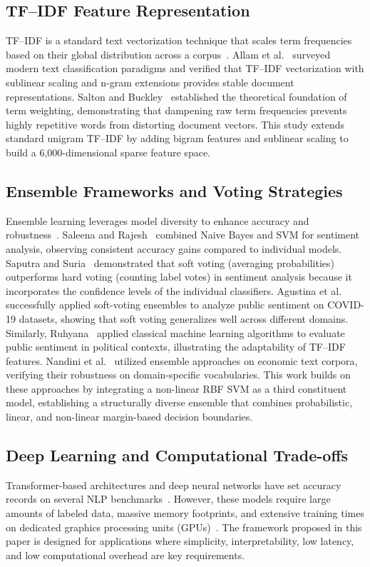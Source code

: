 \documentclass[conference]{IEEEtran}
\begin{document}
\subsection{TF--IDF Feature Representation}
TF--IDF is a standard text vectorization technique that scales term frequencies based on their global distribution across a corpus~\cite{ref7,ref8}. Allam et al.~\cite{ref7} surveyed modern text classification paradigms and verified that TF--IDF vectorization with sublinear scaling and n-gram extensions provides stable document representations. Salton and Buckley~\cite{ref8} established the theoretical foundation of term weighting, demonstrating that dampening raw term frequencies prevents highly repetitive words from distorting document vectors. This study extends standard unigram TF--IDF by adding bigram features and sublinear scaling to build a 6,000-dimensional sparse feature space.

\subsection{Ensemble Frameworks and Voting Strategies}
Ensemble learning leverages model diversity to enhance accuracy and robustness~\cite{ref1,ref5}. Saleena and Rajesh~\cite{ref1} combined Naive Bayes and SVM for sentiment analysis, observing consistent accuracy gains compared to individual models. Saputra and Suria~\cite{ref5} demonstrated that soft voting (averaging probabilities) outperforms hard voting (counting label votes) in sentiment analysis because it incorporates the confidence levels of the individual classifiers. Agustina et al.~\cite{ref6} successfully applied soft-voting ensembles to analyze public sentiment on COVID-19 datasets, showing that soft voting generalizes well across different domains. Similarly, Ruhyana~\cite{ref9} applied classical machine learning algorithms to evaluate public sentiment in political contexts, illustrating the adaptability of TF--IDF features. Nandini et al.~\cite{ref11} utilized ensemble approaches on economic text corpora, verifying their robustness on domain-specific vocabularies. This work builds on these approaches by integrating a non-linear RBF SVM as a third constituent model, establishing a structurally diverse ensemble that combines probabilistic, linear, and non-linear margin-based decision boundaries.

\subsection{Deep Learning and Computational Trade-offs}
Transformer-based architectures and deep neural networks have set accuracy records on several NLP benchmarks~\cite{ref12,ref13}. However, these models require large amounts of labeled data, massive memory footprints, and extensive training times on dedicated graphics processing units (GPUs)~\cite{ref14,ref15}. The framework proposed in this paper is designed for applications where simplicity, interpretability, low latency, and low computational overhead are key requirements.
\end{document}
